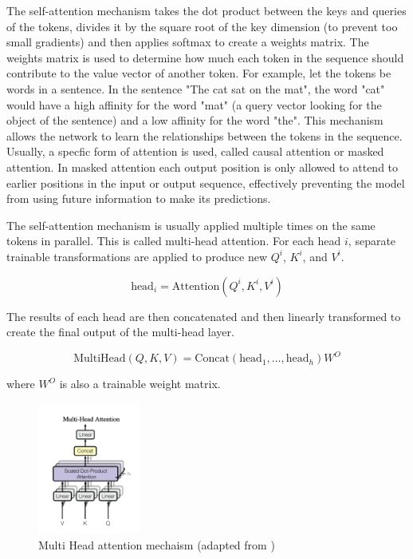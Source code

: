 \documentclass[11pt]{article}
\begin{document}
The self-attention mechanism takes the dot product between the keys and queries of the tokens, divides it by the square root of the key dimension (to prevent too small gradients) and then applies softmax to create a weights matrix. The weights matrix is used to determine how much each token in the sequence should contribute to the value vector of another token. For example, let the tokens be words in a sentence. In the sentence "The cat sat on the mat", the word "cat" would have a high affinity for the word "mat" (a query vector looking for the object of the sentence) and a low affinity for the word "the". This mechanism allows the network to learn the relationships between the tokens in the sequence. Usually, a specfic form of attention is used, called causal attention or masked attention. In masked attention each output position is only allowed to attend to earlier positions in the input or output sequence, effectively preventing the model from using future information to make its predictions.

The self-attention mechanism is usually applied multiple times on the same tokens in parallel. This is called multi-head attention. For each head $i$, separate trainable transformations are applied to produce new $Q^i$, $K^i$, and $V^i$.

$$\text{head}_i = \text{Attention}(Q^i, K^i, V^i)$$

The results of each head are then concatenated and then linearly transformed to create the final output of the multi-head layer.

$$\text{MultiHead}(Q, K, V) = \text{Concat}(\text{head}_1, \ldots, \text{head}_h)W^O$$

where $W^O$ is also a trainable weight matrix.

\begin{figure}[h]
\centering
\includegraphics[width=0.3\textwidth]{multi-head.png}
\caption{Multi Head attention mechaism (adapted from \cite{DBLP:journals/corr/VaswaniSPUJGKP17})}
\end{figure}
\end{document}
